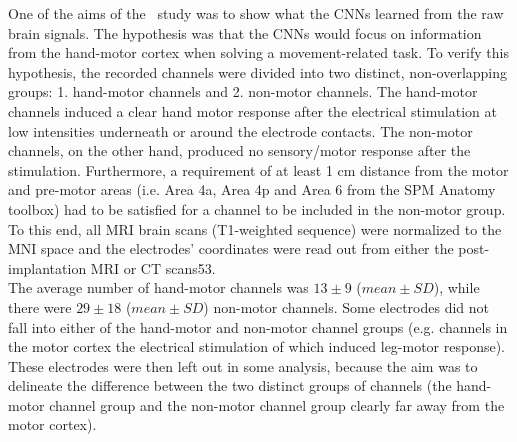 One of the aims of the~\cite{Hammer-2021} study was to show what the CNNs learned from the raw brain signals.
The hypothesis was that the CNNs would focus on information from the hand-motor cortex when solving a movement-related task.
To verify this hypothesis, the recorded channels were divided into two distinct, non-overlapping groups: 1. hand-motor channels and 2. non-motor channels.
The hand-motor channels induced a clear hand motor response after the electrical stimulation at low intensities underneath or around the electrode contacts.
The non-motor channels, on the other hand, produced no sensory/motor response after the stimulation.
Furthermore, a requirement of at least 1 cm distance from the motor and pre-motor areas (i.e. Area 4a, Area 4p and Area 6 from the SPM Anatomy toolbox\cite{eickhoff-new-2005}) had to be satisfied for a channel to be included in the non-motor group.
To this end, all MRI brain scans (T1-weighted sequence) were normalized to the MNI space and the electrodes' coordinates were read out from either the post-implantation MRI or CT scans53. \\

The average number of hand-motor channels was $13 \pm 9$ ($mean \pm SD$), while there were $29 \pm 18$ ($mean \pm SD$) non-motor channels.
Some electrodes did not fall into either of the hand-motor and non-motor channel groups (e.g. channels in the motor cortex the electrical stimulation of which induced leg-motor response).
These electrodes were then left out in some analysis, because the aim was to delineate the difference between the two distinct groups of channels (the hand-motor channel group and the non-motor channel group clearly far away from the motor cortex).



